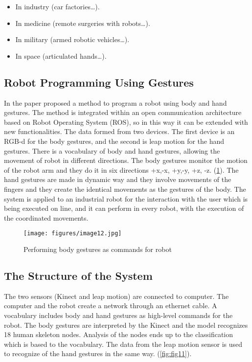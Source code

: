 \documentclass[12pt]{book}
\begin{document}
\begin{itemize}
    \item In industry (car factories…).
    \item In medicine (remote surgeries with robots…). 
    \item In military (armed robotic vehicles…).
    \item In space (articulated hands…).
\end{itemize}

\subsection{Robot Programming Using Gestures}
In the paper \cite{TSA2016} proposed a method to program a robot using body and hand gestures. The method is integrated within an open communication architecture based on Robot Operating System (ROS), so in this way it can be extended with new functionalities. The data formed from two devices. The first device is an RGB-d for the body gestures, and the second is leap motion for the hand gestures. There is a vocabulary of body and hand gestures, allowing the movement of robot in different directions. The body gestures monitor the motion of the robot arm and they do it in six directions +x,-x, +y,-y, +z, -z. (\ref{fig:fig10}). The hand gestures are made in dynamic way and they involve movements of the fingers and they create the identical movements as the gestures of the body. The system is applied to an industrial robot for the interaction with the user which is being executed on line, and it can perform in every robot, with the execution of the coordinated movements.

\begin{figure}[!htbp]
\centering
  \texttt{[image: figures/image12.jpg]}
  \\
  \caption{Performing body gestures as commands for robot \cite{TSA2016}}
  \label{fig:fig10}
\end{figure}

\subsection{The Structure of the System}
The two sensors (Kinect and leap motion) are connected to computer. The computer and the robot create a network through an ethernet cable. A vocabulary includes body and hand gestures as high-level commands for the robot. The body gestures are interpreted by the Kinect and the model recognizes 18 human skeleton nodes. Analysis of the nodes ends up to the classification which is based to the vocabulary. The data from the leap motion sensor is used to recognize of the hand gestures in the same way. (\ref{fig:fig11}). 
\end{document}
